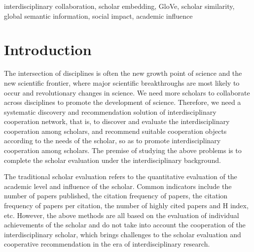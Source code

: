 \documentclass[conference]{IEEEtran}
\begin{document}
\begin{IEEEkeywords}
interdisciplinary collaboration, scholar embedding, GloVe, scholar similarity, global semantic information, social impact, academic influence
\end{IEEEkeywords}


%
\IEEEpeerreviewmaketitle



\section{Introduction}
The intersection of disciplines is often the new growth point of science
and the new scientific frontier, where major scientific breakthroughs
are most likely to occur and revolutionary changes in science. We need
more scholars to collaborate across disciplines to promote the development
of science. Therefore, we need a systematic discovery and recommendation
solution of interdisciplinary cooperation network, that is, to discover
and evaluate the interdisciplinary cooperation among scholars, and
recommend suitable cooperation objects according to the needs of the scholar,
so as to promote interdisciplinary cooperation among scholars.
The premise of studying the above problems is to complete the scholar
evaluation under the interdisciplinary background.

The traditional scholar evaluation refers to the quantitative evaluation
of the academic level and influence of the scholar. Common indicators include
the number of papers published, the citation frequency of papers, the
citation frequency of papers per citation, the number of highly cited
papers and H index, etc. However, the above methods are all based on the
evaluation of individual achievements of the scholar and do not take into
account the cooperation of the interdisciplinary scholar, which brings
challenges to the scholar evaluation and cooperative recommendation in
the era of interdisciplinary research.
\end{document}
